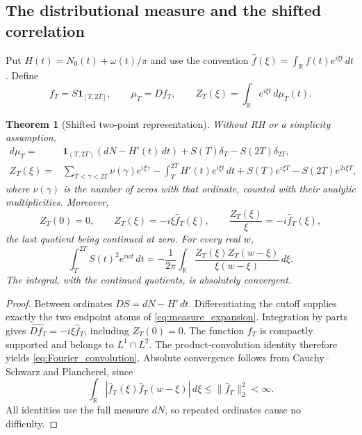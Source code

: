 \documentclass[11pt,reqno]{amsart}
\theoremstyle{plain}\newtheorem{theorem}{Theorem}[section]\newtheorem{proposition}[theorem]{Proposition}\newtheorem{lemma}[theorem]{Lemma}\newtheorem{corollary}[theorem]{Corollary}
\theoremstyle{definition}\newtheorem{hypothesis}[theorem]{Hypothesis}\newtheorem{definition}[theorem]{Definition}
\theoremstyle{remark}\newtheorem{remark}[theorem]{Remark}\newtheorem{experiment}[theorem]{Experiment}\newtheorem{question}[theorem]{Question}\newtheorem{heuristic}[theorem]{Heuristic}\newtheorem{conjecture}[theorem]{Conjecture}
\newcommand{\NO}{N_0}\newcommand{\lL}{\mathcal L}\newcommand{\IT}{\mathcal I_T}\newcommand{\R}{\mathbb R}\newcommand{\N}{\mathbb N}\newcommand{\eps}{\varepsilon}\newcommand{\sgn}{\operatorname{sgn}}
\begin{document}
\subsection{The distributional measure and the shifted correlation}
\label{subsec:distributional_measure}
Put $H(t)=\NO(t)+\omega(t)/\pi$ and use the convention $\widehat f(\xi)=\int_\R f(t)e^{i\xi t}\,dt$. Define
\begin{equation}
 f_T=S\mathbf1_{[T,2T]},\qquad \mu_T=Df_T,
 \qquad Z_T(\xi)=\int_\R e^{i\xi t}\,d\mu_T(t).
 \label{eq:measure_def}
\end{equation}
\begin{theorem}[Shifted two-point representation]\label{thm:Fourier_exact}
Without RH or a simplicity assumption,
\begin{equation}
 \begin{split}
 d\mu_T={}&\mathbf1_{(T,2T)}(dN-H'(t)\,dt)
          +S(T)\delta_T-S(2T)\delta_{2T},\\
 Z_T(\xi)={}&\sum_{T<\gamma<2T}\nu(\gamma)e^{i\xi\gamma}
       -\int_T^{2T}H'(t)e^{i\xi t}\,dt
       +S(T)e^{i\xi T}-S(2T)e^{2i\xi T},
 \end{split}
 \label{eq:measure_expansion}
\end{equation}
where $\nu(\gamma)$ is the number of zeros with that ordinate, counted with their analytic multiplicities. Moreover,
\begin{equation}
 Z_T(0)=0,\qquad Z_T(\xi)=-i\xi\widehat f_T(\xi),
 \qquad \frac{Z_T(\xi)}{\xi}=-i\widehat f_T(\xi),
 \label{eq:ZT_removable}
\end{equation}
the last quotient being continued at zero. For every real $w$,
\begin{equation}
 \int_T^{2T}S(t)^2e^{iwt}\,dt
  =-\frac1{2\pi}\int_\R
       \frac{Z_T(\xi)Z_T(w-\xi)}{\xi(w-\xi)}\,d\xi .
 \label{eq:Fourier_convolution}
\end{equation}
The integral, with the continued quotients, is absolutely convergent.
\end{theorem}
\begin{proof}
Between ordinates $DS=dN-H'\,dt$. Differentiating the cutoff supplies exactly the two endpoint atoms of \eqref{eq:measure_expansion}. Integration by parts gives $\widehat{Df_T}=-i\xi\widehat f_T$, including $Z_T(0)=0$. The function $f_T$ is compactly supported and belongs to $L^1\cap L^2$. The product-convolution identity therefore yields \eqref{eq:Fourier_convolution}. Absolute convergence follows from Cauchy--Schwarz and Plancherel, since
\begin{equation}
 \int_\R|\widehat f_T(\xi)\widehat f_T(w-\xi)|\,d\xi
                   \le\|\widehat f_T\|_2^2<\infty.
 \label{eq:Fourier_absolute}
\end{equation}
All identities use the full measure $dN$, so repeated ordinates cause no difficulty.
\end{proof}
\end{document}
